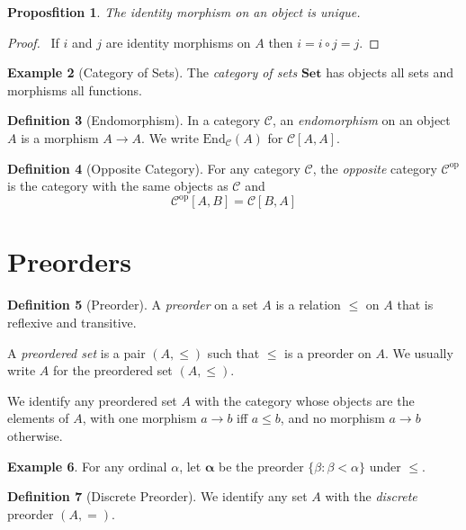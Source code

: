 \documentclass{book}
\let\qed\relax
\newtheorem{prop}{Proposfition}[chapter]
\theoremstyle{definition}
\newtheorem{df}[prop]{Definition}
\newtheorem{ex}[prop]{Example}
\newcommand{\Set}{\ensuremath{\mathbf{Set}}}
\begin{document}
\begin{prop}
    \label{prop:id-morph-unique}
    The identity morphism on an object is unique.
\end{prop}

\begin{proof}
    \pf\ If $i$ and $j$ are identity morphisms on $A$ then $i = i \circ j = j$. \qed
\end{proof}

\begin{ex}[Category of Sets]
    The \emph{category of sets} $\Set$ has objects all sets and morphisms all functions.
\end{ex}

\begin{df}[Endomorphism]
    In a category $\mathcal{C}$, an \emph{endomorphism} on an object $A$ is a morphism $A \rightarrow A$. We write $\mathrm{End}_\mathcal{C}(A)$ for $\mathcal{C}[A,A]$.
\end{df}

\begin{df}[Opposite Category]
    For any category $\mathcal{C}$, the \emph{opposite} category $\mathcal{C}^\mathrm{op}$ is the category with the same objects as $\mathcal{C}$ and
    \[ \mathcal{C}^\mathrm{op}[A,B] = \mathcal{C}[B,A] \]
\end{df}

\section{Preorders}

\begin{df}[Preorder]
    A \emph{preorder} on a set $A$ is a relation $\leq$ on $A$ that is reflexive and transitive.

    A \emph{preordered set} is a pair $(A, \leq)$ such that $\leq$ is a preorder on
    $A$. We usually write $A$ for the preordered set $(A, \leq)$.

    We identify any preordered set $A$ with the category whose objects are the
    elements of $A$, with one morphism $a \rightarrow b$ iff $a \leq b$, and no
    morphism $a \rightarrow b$ otherwise.
\end{df}

\begin{ex}
    For any ordinal $\alpha$, let $\mathbf{\alpha}$ be the preorder $\{ \beta : \beta < \alpha \}$ under $\leq$.
\end{ex}

\begin{df}[Discrete Preorder]
    We identify any set $A$ with the \emph{discrete} preorder $(A, =)$.
\end{df}
\end{document}

